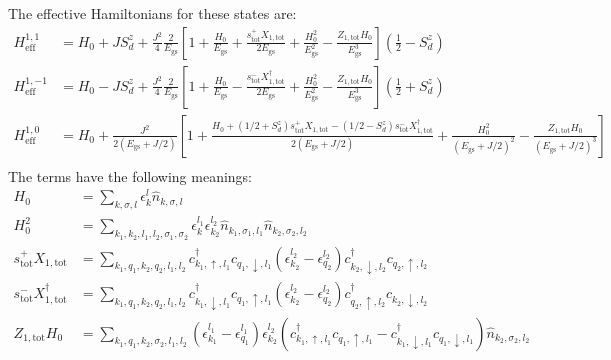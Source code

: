 \documentclass{revtex4-2}
\numberwithin{equation}{section}
\begin{document}
The effective Hamiltonians for these states are:
\begin{align}
	H_\text{eff}^{1, 1} &= H_0 + J S_d^z + \frac{J^2}{4}\frac{2}{E_\text{gs}}\left[1 + \frac{H_0}{E_\text{gs}} + \frac{s^+_\text{tot}X_{1,\text{tot}}}{2 E_\text{gs}} + \frac{H_0^2 }{E_\text{gs}^2} - \frac{Z_{1,\text{tot}} H_0}{E_\text{gs}^3}\right] \left(\frac{1}{2} - S_d^z\right) \\
	H_\text{eff}^{1, -1} &= H_0 - J S_d^z + \frac{J^2}{4}\frac{2}{E_\text{gs}}\left[1 + \frac{H_0}{E_\text{gs}}  - \frac{s^-_\text{tot}X^\dagger_{1,\text{tot}}}{2 E_\text{gs}}  + \frac{H_0^2}{E_\text{gs}^2}  - \frac{ Z_{1,\text{tot}} H_0}{E_\text{gs}^3}\right] \left(\frac{1}{2} + S_d^z\right) \\
	H_\text{eff}^{1, 0} &= H_0 + \frac{J^2}{2\left(E_\text{gs} + J/2\right)}\left[1 + \frac{ H_0 + \left(1/2 + S_d^z\right) s^+_\text{tot}X_{1,\text{tot}} - \left(1/2 - S_d^z\right) s^-_\text{tot}X^\dagger_{1,\text{tot}}}{2 \left(E_\text{gs} + J/2\right)} + \frac{H_0^2}{\left(E_\text{gs} + J/2\right)^2} - \frac{Z_{1,\text{tot}} H_0}{\left(E_\text{gs} + J/2\right)^3} \right] \\
\end{align}
The terms have the following meanings:
\begin{equation}\begin{aligned}
	H_0 &= \sum_{k,\sigma,l}\epsilon_k^l \hat n_{k,\sigma,l}\\
	H_0^2 &= \sum_{k_1,k_2,l_1,l_2,\sigma_1,\sigma_2}\epsilon_k^{l_1}\epsilon_{k_2}^{l_2} \hat n_{k_1,\sigma_1,l_1}\hat n_{k_2,\sigma_2,l_2}\\
	s^+_\text{tot}X_{1,\text{tot}} &= \sum_{k_1,q_1,k_2,q_2,l_1,l_2}c^\dagger_{k_1, \uparrow, l_1}c_{q_1, \downarrow, l_1} \left(\epsilon_{k_2}^{l_2} - \epsilon_{q_2}^{l_2}\right) c^\dagger_{k_2, \downarrow, l_2}c_{q_2, \uparrow, l_2}\\
	s^-_\text{tot}X^\dagger_{1,\text{tot}} &= \sum_{k_1,q_1,k_2,q_2,l_1,l_2}c^\dagger_{k_1, \downarrow, l_1}c_{q_1, \uparrow, l_1} \left(\epsilon_{k_2}^{l_2} - \epsilon_{q_2}^{l_2}\right) c^\dagger_{q_2, \uparrow, l_2}c_{k_2, \downarrow, l_2}\\
	Z_{1,\text{tot}} H_0 &= \sum_{k_1,q_1,k_2,\sigma_2,l_1,l_2}\left(\epsilon_{k_1}^{l_1} - \epsilon_{q_1}^{l_1}\right) \epsilon_{k_2}^{l_2} \left(c^\dagger_{k_1, \uparrow, l_1}c_{q_1, \uparrow, l_1} - c^\dagger_{k_1, \downarrow, l_1}c_{q_1, \downarrow, l_1}\right) \hat n_{k_2,\sigma_2,l_2}\\
\end{aligned}\end{equation}
\end{document}
